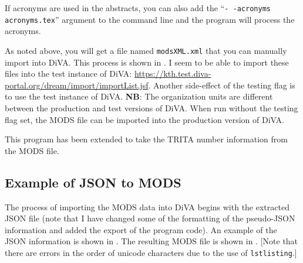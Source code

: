 \documentclass[12pt, twoside]{article}
\newcommand{\fname}[1]{\texttt{#1}}
\begin{document}
If acronyms are used in the abstracts, you can also add the \enquote{\fname{-\,-acronyms acronyms.tex}} argument to the command line and the program will process the acronyms.

As noted above, you will get a file named \fname{modsXML.xml} that you can manually import into \gls{DiVA}. This process is shown in . I seem to be able to import these files into the test instance of \gls{DiVA}:	\url{https://kth.test.diva-portal.org/dream/import/importList.jsf}. Another side-effect of the testing flag is to use the test instance of DiVA. \textbf{NB}: The organization units are different between the production and test versions of \gls{DiVA}. When run without the testing flag set, the \gls{MODS} file can be imported into the production version of \gls{DiVA}.

This program has been extended to take the TRITA number information from the \gls{MODS} file.

\subsection{Example of JSON to MODS}
The process of importing the \gls{MODS} data into \gls{DiVA} begins with the extracted \gls{JSON} file (note that I have changed some of the formatting of the pseudo-JSON information and added the export of the program code). An example of the \gls{JSON} information is shown in . The resulting \gls{MODS} file is shown in . [Note that there are errors in the order of unicode characters due to the use of \texttt{lstlisting}.]
\end{document}
